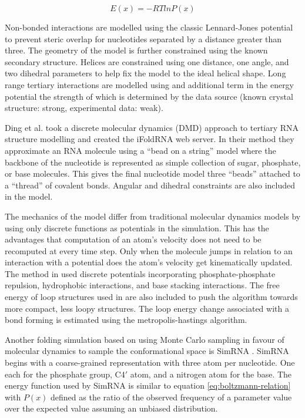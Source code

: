 \documentclass[journal]{IEEEtran}
\begin{document}
\begin{equation}
\label{eq:boltzmann-relation}
	E(x) = -RT ln P(x)
\end{equation}

Non-bonded interactions are modelled using the classic Lennard-Jones potential to prevent steric overlap for nucleotides separated by a distance greater than three. The geometry of the model is further constrained using the known secondary structure. Helices are constrained using one distance, one angle, and two dihedral parameters to help fix the model to the ideal helical shape. Long range tertiary interactions are modelled using and additional term in the energy potential the strength of which is determined by the data source (known crystal structure: strong, experimental data: weak).

Ding et al. \cite{ding2008ab} took a discrete molecular dynamics (DMD) approach to tertiary RNA structure modelling and created the iFoldRNA web server. In their method they approximate an RNA molecule using a ``bead on a string'' model where the backbone of the nucleotide is represented as simple collection of sugar, phosphate, or base molecules. This gives the final nucleotide model three ``beads'' attached to a ``thread'' of covalent bonds. Angular and dihedral constraints are also included in the model.

The mechanics of the model differ from traditional molecular dynamics models by using only discrete functions as potentials in the simulation. This has the advantages that computation of an atom's velocity does not need to be recomputed at every time step. Only when the molecule jumps in relation to an interaction with a potential does the atom's velocity get kinematically updated. The method in \cite{ding2008ab} used discrete potentials incorporating phosphate-phosphate repulsion, hydrophobic interactions, and base stacking interactions. The free energy of loop structures used in \cite{mathews1999expanded} are also included to push the algorithm towards more compact, less loopy structures. The loop energy change associated with a bond forming is estimated using the metropolis-hastings algorithm.

Another folding simulation based on using Monte Carlo sampling in favour of molecular dynamics to sample the conformational space is SimRNA \cite{rother2012template}. SimRNA begins with a coarse-grained representation with three atom per nucleotide. One each for the phosphate group, C4$'$ atom, and a nitrogen atom for the base. The energy function used by SimRNA is similar to equation \ref{eq:boltzmann-relation} with $P(x)$ defined as the ratio of the observed frequency of a parameter value over the expected value assuming an unbiased distribution. 
\end{document}
